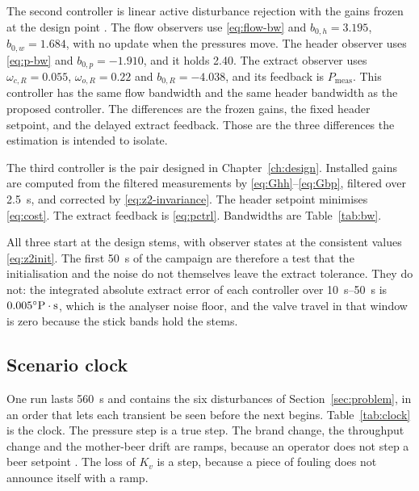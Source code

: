 The second controller is linear active disturbance rejection with the gains frozen at the design point \cite{gao2003scaling,han2009pid}. The flow observers use \eqref{eq:flow-bw} and $b_{0,h}=3.195$, $b_{0,w}=1.684$, with no update when the pressures move. The header observer uses \eqref{eq:p-bw} and $b_{0,p}=-1.910$, and it holds \SI{2.40}{\barg}. The extract observer uses $\omega_{c,R}=0.055$, $\omega_{o,R}=0.22$ and $b_{0,R}=-4.038$, and its feedback is $P_{\mathrm{meas}}$. This controller has the same flow bandwidth and the same header bandwidth as the proposed controller. The differences are the frozen gains, the fixed header setpoint, and the delayed extract feedback. Those are the three differences the estimation is intended to isolate.

The third controller is the pair designed in Chapter~\ref{ch:design}. Installed gains are computed from the filtered measurements by \eqref{eq:Ghh}--\eqref{eq:Gbp}, filtered over \SI{2.5}{s}, and corrected by \eqref{eq:z2-invariance}. The header setpoint minimises \eqref{eq:cost}. The extract feedback is \eqref{eq:pctrl}. Bandwidths are Table~\ref{tab:bw}.

All three start at the design stems, with observer states at the consistent values \eqref{eq:z2init}. The first \SI{50}{s} of the campaign are therefore a test that the initialisation and the noise do not themselves leave the extract tolerance. They do not: the integrated absolute extract error of each controller over \SIrange{10}{50}{s} is $0.005^{\circ}\mathrm{P}\cdot\mathrm{s}$, which is the analyser noise floor, and the valve travel in that window is zero because the stick bands hold the stems.

\subsection{Scenario clock}

One run lasts \SI{560}{s} and contains the six disturbances of Section~\ref{sec:problem}, in an order that lets each transient be seen before the next begins. Table~\ref{tab:clock} is the clock. The pressure step is a true step. The brand change, the throughput change and the mother-beer drift are ramps, because an operator does not step a beer setpoint \cite{kunze2014brewing,shinskey1996process}. The loss of $K_v$ is a step, because a piece of fouling does not announce itself with a ramp.

